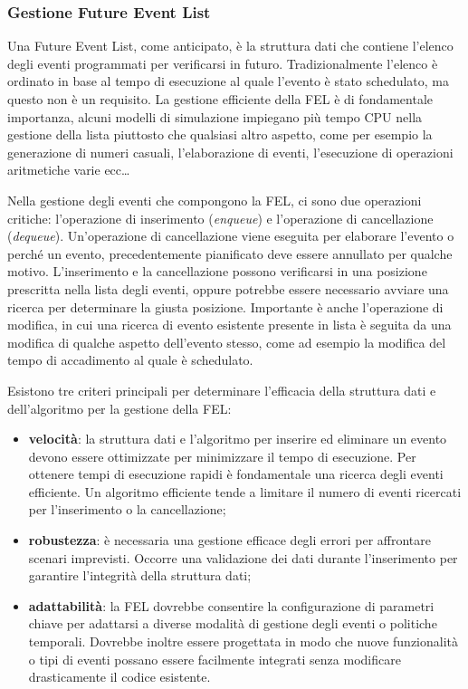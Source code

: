 \documentclass[12pt,a4paper,openright,twoside]{book}
\begin{document}
\subsubsection{Gestione Future Event List}
Una Future Event List, come anticipato, è la struttura dati che contiene l'elenco degli eventi programmati per verificarsi in futuro. Tradizionalmente l'elenco è ordinato in base al tempo di esecuzione al quale l'evento è stato schedulato, ma questo non è un requisito. 
La gestione efficiente della FEL è di fondamentale importanza, alcuni modelli di simulazione impiegano più tempo CPU nella gestione della lista piuttosto che qualsiasi altro aspetto, come per esempio la generazione di numeri casuali, l'elaborazione di eventi, l'esecuzione di operazioni aritmetiche varie ecc\dots

Nella gestione degli eventi che compongono la FEL, ci sono due operazioni critiche: l'operazione di inserimento (\textit{enqueue}) e l'operazione di cancellazione (\textit{dequeue}). Un'operazione di cancellazione viene eseguita per elaborare l'evento o perché un evento, precedentemente pianificato deve essere annullato per qualche motivo. L'inserimento e la cancellazione possono verificarsi in una posizione prescritta nella lista degli eventi, oppure potrebbe essere necessario avviare una ricerca per determinare la giusta posizione. 
Importante è anche l'operazione di modifica, in cui una ricerca di evento esistente presente in lista è seguita da una modifica di qualche aspetto dell'evento stesso, come ad esempio la modifica del tempo di accadimento al quale è schedulato. 

Esistono tre criteri principali per determinare l'efficacia della struttura dati e dell'algoritmo per la gestione della FEL: 
\begin{itemize}
    \item \textbf{velocità}: la struttura dati e l'algoritmo per inserire ed eliminare un evento devono essere ottimizzate per minimizzare il tempo di esecuzione. Per ottenere tempi di esecuzione rapidi è fondamentale una ricerca degli eventi efficiente. Un algoritmo efficiente tende a limitare il numero di eventi ricercati per l'inserimento o la cancellazione;
    \item  \textbf{robustezza}: è necessaria una gestione efficace degli errori per affrontare scenari imprevisti. Occorre una validazione dei dati durante l'inserimento per garantire l'integrità della struttura dati; 
    \item \textbf{adattabilità}: la FEL dovrebbe consentire la configurazione di parametri chiave per adattarsi a diverse modalità di gestione degli eventi o politiche temporali. Dovrebbe inoltre essere progettata in modo che nuove funzionalità o tipi di eventi possano essere facilmente integrati senza modificare drasticamente il codice esistente. 
\end{itemize}
\end{document}
